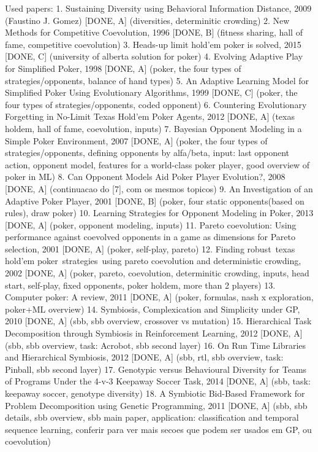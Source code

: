 Used papers:
1. Sustaining Diversity using Behavioral Information Distance, 2009 (Faustino J. Gomez) [DONE, A] (diversities, determinitic crowding)
2. New Methods for Competitive Coevolution, 1996 [DONE, B] (fitness sharing, hall of fame, competitive coevolution)
3. Heads-up limit hold’em poker is solved, 2015 [DONE, C] (university of alberta solution for poker)
4. Evolving Adaptive Play for Simplified Poker, 1998 [DONE, A] (poker, the four types of strategies/opponents, balance of hand types)
5. An Adaptive Learning Model for Simplified Poker Using Evolutionary Algorithms, 1999 [DONE, C] (poker, the four types of strategies/opponents, coded opponent)
6. Countering Evolutionary Forgetting in No-Limit Texas Hold’em Poker Agents, 2012 [DONE, A] (texas holdem, hall of fame, coevolution, inputs)
7. Bayesian Opponent Modeling in a Simple Poker Environment, 2007 [DONE, A] (poker, the four types of strategies/opponents, defining opponents by alfa/beta, input: last opponent action, opponent model, features for a world-class poker player, good overview of poker in ML)
8. Can Opponent Models Aid Poker Player Evolution?, 2008 [DONE, A] (continuacao do [7], com os mesmos topicos)
9. An Investigation of an Adaptive Poker Player, 2001 [DONE, B] (poker, four static opponents(based on rules), draw poker)
10. Learning Strategies for Opponent Modeling in Poker, 2013 [DONE, A] (poker, opponent modeling, inputs)
11. Pareto coevolution: Using performance against coevolved opponents in a game as dimensions for Pareto selection, 2001 [DONE, A] (poker, self-play, pareto)
12. Finding robust texas hold'em poker strategies using pareto coevolution and deterministic crowding, 2002 [DONE, A] (poker, pareto, coevolution, determinitic crowding, inputs, head start, self-play, fixed opponents, poker holdem, more than 2 players)
13. Computer poker: A review, 2011 [DONE, A] (poker, formulas, nash x exploration, poker+ML overview)
14. Symbiosis, Complexication and Simplicity under GP, 2010 [DONE, A] (sbb, sbb overview, crossover vs mutation)
15. Hierarchical Task Decomposition through Symbiosis in Reinforcement Learning, 2012 [DONE, A] (sbb, sbb overview, task: Acrobot, sbb second layer)
16. On Run Time Libraries and Hierarchical Symbiosis, 2012 [DONE, A] (sbb, rtl, sbb overview, task: Pinball, sbb second layer)
17. Genotypic versus Behavioural Diversity for Teams of Programs Under the 4-v-3 Keepaway Soccer Task, 2014 [DONE, A] (sbb, task: keepaway soccer, genotype diversity)
18. A Symbiotic Bid-Based Framework for Problem Decomposition using Genetic Programming, 2011 [DONE, A] (sbb, sbb details, sbb overview, sbb main paper, application: classification and temporal sequence learning, conferir para ver mais secoes que podem ser usados em GP, ou coevolution)


